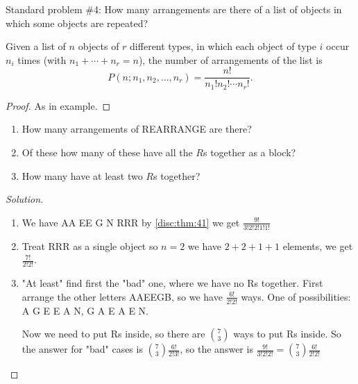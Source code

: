 \documentclass[10pt, a4paper]{article}
\begin{document}
Standard problem \#4: How many arrangements are there of a list of objects in which some objects are repeated?

\begin{theorem}\label{disc:thm:41}
    Given a list of $n$ objects of $r$ different types, in which each object of type $i$ occur $n_i$ times (with $n_1 + \dotsi + n_r = n$), the number of arrangements of the list is
    \[
    P(n; n_1, n_2, \dotsc, n_r) = \frac{n!}{n_1!n_2!\dotsi n_r!}.
    \]
    \begin{proof}
        As in example.
    \end{proof}
\end{theorem}

\begin{example}\phantom{}
    \begin{enumerate}[label = (D\arabic*)]
        \item  How many arrangements of REARRANGE are there?
        \item Of these how many of these have all the $R$s together as a block?
        \item How many have at least two $R$s together?
    \end{enumerate}

    \begin{proof}[Solution]\renewcommand{\qedsymbol}{}\phantom{}
        \begin{enumerate}[label = (D\arabic*)]
            \item
            We have
            AA EE G N RRR
            by \autoref{disc:thm:41} we get $\frac{9!}{3!2!2!1!1!}$
            \item Treat RRR as a single object so
            $n = 2$ we have $2 + 2 + 1 + 1$ elements,
            we get $\frac{7!}{2!2!}$.
            \item
            "At least" find first the "bad" one,
            where we have no Rs together.
            First arrange the other letters AAEEGB,
            so we have $\frac{6!}{2!2!}$ ways.
            One of possibilities: A G E E A N, G A E A E N.
            
            Now we need to put Rs inside,
            so there are $\binom{7}{3}$ ways to put Rs inside.
            So the answer for "bad" cases is $\binom{7}{3}\frac{6!}{2!3!}$,
            so the answer is $\frac{9!}{3!2!2!} = \binom{7}{3}\frac{6!}{2!2!}$
        \end{enumerate}
    \end{proof}
\end{example}
\end{document}
